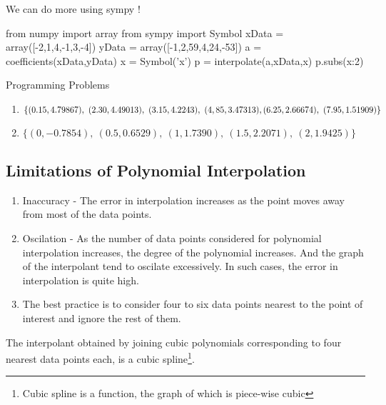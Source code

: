 \begin{program}
	We can do more using sympy !
	\begin{python}
		from numpy import array
		from sympy import Symbol
		xData = array([-2,1,4,-1,3,-4])
		yData = array([-1,2,59,4,24,-53])
		a = coefficients(xData,yData)
		x = Symbol('x')
		p = interpolate(a,xData,x)
		p.subs({x:2})
	\end{python}
\end{program}

\begin{remark}
	Programming Problems
	\begin{enumerate}
		\item $\{(0.15,4.79867),\ (2.30,4.49013),\ (3.15,4.2243),\ (4,85,3.47313),\\ (6.25,2.66674),\ (7.95,1.51909)\}$ \cite[Example 3.4]{kiusalaas}
		\item $\{(0,-0.7854),\ (0.5,0.6529),\ (1,1.7390),\ (1.5,2.2071),\ (2,1.9425)\}$\\ \cite[Problem Set 3.1.5]{kiusalaas}
	\end{enumerate}
\end{remark}
\subsection{Limitations of Polynomial Interpolation}
\begin{enumerate}
	\item Inaccuracy - The error in interpolation increases as the point moves away from most of the data points.
	\item Oscilation - As the number of data points considered for polynomial interpolation increases, the degree of the polynomial increases. And the graph of the interpolant tend to oscilate excessively. In such cases, the error in interpolation is quite high. 
	\item The best practice is to consider four to six data points nearest to the point of interest and ignore the rest of them.
\end{enumerate}
\begin{remark}
	The interpolant obtained by joining cubic polynomials corresponding to four nearest data points each, is a cubic spline\footnote{Cubic spline is a function, the graph of which is piece-wise cubic}.
\end{remark}

